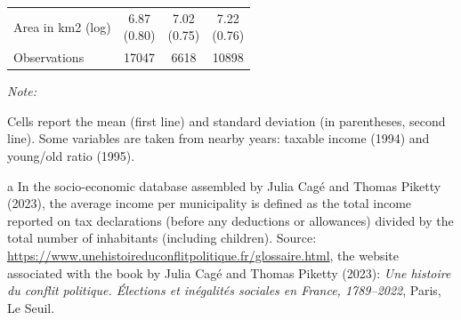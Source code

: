 \begin{table}[!h]
{\begin{threeparttable}
\begin{tabular}[t]{>{\raggedright\arraybackslash}p{7cm}ccc}
\hspace{1em}Area in km2 (log) & \makecell{6.87 \\ (0.80)} & \makecell{7.02 \\ (0.75)} & \makecell{7.22 \\ (0.76)}\\
\hspace{1em}Observations & 17047 & 6618 & 10898\\
\bottomrule
\end{tabular}
\begin{tablenotes}
\item \textit{Note: }
\item Cells report the mean (first line) and standard deviation (in parentheses, second line). Some variables are taken from nearby years: taxable income (1994) and young/old ratio (1995).
\item[a] In the socio-economic database assembled by Julia Cag\'e and Thomas Piketty (2023), the average income per municipality is defined as the total income reported on tax declarations (before any deductions or allowances) divided by the total number of inhabitants (including children). Source: \url{https://www.unehistoireduconflitpolitique.fr/glossaire.html}, the website associated with the book by Julia Cag\'e and Thomas Piketty (2023): \textit{Une histoire du conflit politique. \'{E}lections et in\'{e}galit\'{e}s sociales en France, 1789--2022}, Paris, Le Seuil.
\end{tablenotes}
\end{threeparttable}}
\end{table}
